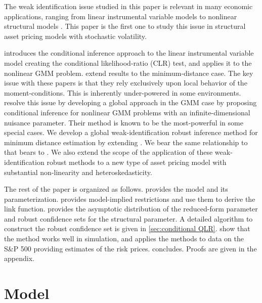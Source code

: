 The weak identification issue studied in this paper is relevant in many economic applications, ranging from linear instrumental variable models \parencite{staiger1997instrumental} to nonlinear structural models \parencites{mavroeidis2014empirical, andrews2015maximum}. This paper is the first one to study this issue in structural asset pricing models with stochastic volatility. 

\Textcite{moreira2003conditional} introduces the conditional inference approach to the linear instrumental variable model creating the conditional likelihood-ratio (CLR) test, and \textcite{kleibergen2005testing} applies it to the nonlinear GMM problem.  \Textcites{magnusson2010identification, magnusson2010inference} extend  results to the minimum-distance case.  The key issue with these papers is that they rely exclusively upon local behavior of the moment-conditions. This is inherently under-powered in some environments. \Textcite{andrews2016conditional} resolve this issue by developing a global approach in the GMM case by proposing conditional inference for nonlinear GMM problems with an infinite-dimensional nuisance parameter. Their method is known to be the most-powerful in some special cases.  We develop a global weak-identification robust inference method for minimum distance estimation by extending \textcite{andrews2016conditional}. We bear the same relationship to  \textcites{magnusson2010identification, magnusson2010inference} that \textcite{andrews2016conditional} bears to \textcite{kleibergen2005testing}.  We also extend the scope of the application of these weak-identification robust methods to a new type of asset pricing model with substantial non-linearity and heteroskedasticity. 

The rest of the paper is organized as follows.  provides the model and its parameterization.  provides model-implied restrictions and use them to derive the link function.  provides the asymptotic distribution of the reduced-form parameter and robust confidence sets for the structural parameter. A detailed algorithm to construct the robust confidence set is given in \cref{sec:conditional QLR}. 
 show that the method works well in simulation, and  applies the methods to data on the S\&P 500 providing estimates of the risk prices.  concludes. 
Proofs are given in the appendix.

\section{Model}\label{sec:model}

